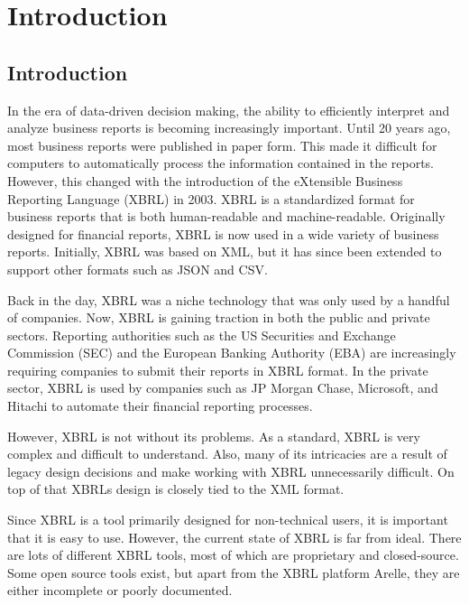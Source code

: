 \chapter{Introduction}
\label{sec:introduction}

\section{Introduction}


In the era of data-driven decision making, the ability to efficiently interpret and analyze business reports is becoming increasingly important.
Until 20 years ago, most business reports were published in paper form.
This made it difficult for computers to automatically process the information contained in the reports.
However, this changed with the introduction of the eXtensible Business Reporting Language (XBRL) in 2003.
XBRL is a standardized format for business reports that is both human-readable and machine-readable.
Originally designed for financial reports, XBRL is now used in a wide variety of business reports.
Initially, XBRL was based on XML, but it has since been extended to support other formats such as JSON and CSV.

Back in the day, XBRL was a niche technology that was only used by a handful of companies.
Now, XBRL is gaining traction in both the public and private sectors.
Reporting authorities such as the US Securities and Exchange Commission (SEC) and the European Banking Authority (EBA)\cite{eba_reporting_frameworks} are increasingly requiring companies to submit their reports in XBRL format.\cite{sec_ixbrl}
In the private sector, XBRL is used by companies such as JP Morgan Chase, Microsoft, and Hitachi to automate their financial reporting processes.\cite{pwc2002thejournal}

However, XBRL is not without its problems.
As a standard, XBRL is very complex and difficult to understand.
Also, many of its intricacies are a result of legacy design decisions and make working with XBRL unnecessarily difficult.
On top of that XBRLs design is closely tied to the XML format.

Since XBRL is a tool primarily designed for non-technical users, it is important that it is easy to use.
However, the current state of XBRL is far from ideal.
There are lots of different XBRL tools, most of which are proprietary and closed-source.
Some open source tools exist, but apart from the XBRL platform Arelle\cite{arelle}, they are either incomplete or poorly documented.


